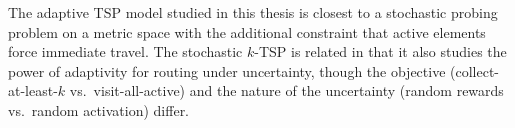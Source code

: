 The adaptive TSP model studied in this thesis is closest to a stochastic probing problem on a metric space with the additional constraint that active elements force immediate travel. The stochastic $k$-TSP is related in that it also studies the power of adaptivity for routing under uncertainty, though the objective (collect-at-least-$k$ vs.\ visit-all-active) and the nature of the uncertainty (random rewards vs.\ random activation) differ.
